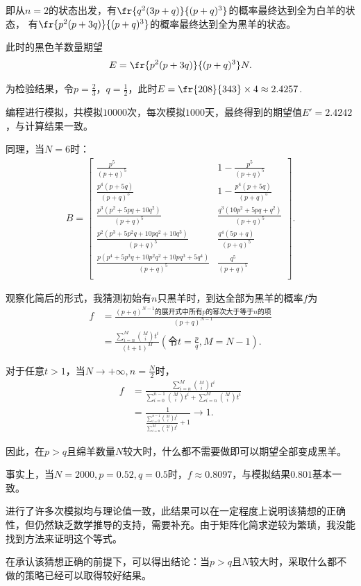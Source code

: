 即从$n=2$的状态出发，有$\fr{q^2(3p+q)}{(p+q)^3}$的概率最终达到全为白羊的状态，
有$\fr{p^2(p+3q)}{(p+q)^3}$的概率最终达到全为黑羊的状态。

此时的黑色羊数量期望
\begin{align*}
    E = \fr{p^2(p+3q)}{(p+q)^3}N
.\end{align*}

为检验结果，令$p=\frac{2}{3}$，$q=\frac{1}{2}$，此时$E = \fr{208}{343} \times 4 \approx 2.4257$.

编程进行模拟，共模拟$10000$次，每次模拟$1000$天，最终得到的期望值$E' = 2.4242$，与计算结果一致。

同理，当$N=6$时：
\begin{align*}
    B =
    \begin{bmatrix} 
         \frac{p^5}{(p+q)^5} & 1-\frac{p^5}{(p+q)^5} \\
         \frac{p^4 (p+5 q)}{(p+q)^5} & 1-\frac{p^4 (p+5 q)}{(p+q)^5} \\
         \frac{p^3 \left(p^2+5 p q+10 q^2\right)}{(p+q)^5} & \frac{q^3 \left(10 p^2+5 p q+q^2\right)}{(p+q)^5} \\
         \frac{p^2 \left(p^3+5 p^2 q+10 p q^2+10 q^3\right)}{(p+q)^5} & \frac{q^4 (5 p+q)}{(p+q)^5} \\
         \frac{p \left(p^4+5 p^3 q+10 p^2 q^2+10 p q^3+5 q^4\right)}{(p+q)^5} & \frac{q^5}{(p+q)^5} \\
    \end{bmatrix} 
.\end{align*}

观察化简后的形式，我猜测初始有$n$只黑羊时，到达全部为黑羊的概率$f$为
\begin{align*}
    f &=\frac{(p+q)^{N-1}\text{的展开式中所有}p\text{的幂次大于等于}n\text{的项}}{(p+q)^{N-1}} \\
      &= \frac{\sum_{i=n}^M \binom M i t^i}{(t+1)^M} (\text{令}t=\frac{p}{q}, M = N - 1)
.\end{align*}

对于任意$t > 1$，当$N \to +\infty, n = \frac{N}{2}$时，
\begin{align*}
    f &= \frac{\sum_{i=n}^M \binom M i t^i}{\sum_{i=0}^{n-1} \binom M i t^i + \sum_{i=n}^M \binom M i t^i} \\
      &= \frac{1}{\frac{\sum_{i=0}^{n-1} \binom M i t^i}{\sum_{i=n}^M \binom M i t^i} + 1} \to 1
.\end{align*}

因此，在$p>q$且绵羊数量$N$较大时，什么都不需要做即可以期望全部变成黑羊。

事实上，当$N = 2000, p = 0.52, q = 0.5$时，$f \approx 0.8097$，与模拟结果$0.801$基本一致。

进行了许多次模拟均与理论值一致，此结果可以在一定程度上说明该猜想的正确性，但仍然缺乏数学推导的支持，需要补充。由于矩阵化简求逆较为繁琐，我没能找到方法来证明这个等式。

在承认该猜想正确的前提下，可以得出结论：当$p>q$且$N$较大时，采取什么都不做的策略已经可以取得较好结果。


